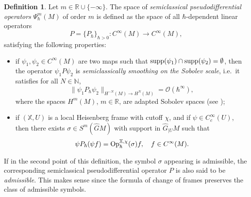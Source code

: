 \documentclass[12pt,a4paper]{amsart}
\theoremstyle{plain}
\theoremstyle{definition}
\newtheorem{definition}[theorem]{Definition}
\theoremstyle{remark}
\numberwithin{equation}{section}
\theoremstyle{definition}
\def\R{{\mathbb R}}%
\def\N{{\mathbb N}}%
\def \Op{{\rm Op}}
\def \supp {{\rm supp}}
\def \bX{\mathbb{X}}
\def \Ghat{\widehat{G}}
\numberwithin{equation}{section}
\begin{document}
\begin{definition}
    \label{def:pseudodiffM}
    Let $m\in\R\cup\{-\infty\}$. The space of \emph{semiclassical pseudodifferential operators} $\Psi_{\hbar}^m(M)$ of order $m$ is defined as the space of all $\hbar$-dependent linear operators 
    \begin{equation*}
        P = \{P_\hbar\}_{\hbar>0}: C^\infty(M)\rightarrow C^\infty(M),
    \end{equation*}
    satisfying the following properties:
    \begin{itemize}
        \item[(i)] if $\psi_1,\psi_2\in C^\infty(M)$ are two maps such that $\supp(\psi_1)\cap\supp(\psi_2) = \emptyset$, then the operator $\psi_1 P \psi_2$ is \emph{semiclassically smoothing on the Sobolev scale}, i.e.~it satisfies for all $N\in \N$,
        \begin{equation*}
            \|\psi_1 P_\hbar \psi_2 \|_{H^{-N}(M)\rightarrow H^{N}(M)} = \mathscr{O}(\hbar^\infty),
        \end{equation*}
        where the spaces $H^m(M)$, $m\in \R$, are adapted Sobolev spaces (see \cite[Section 9.5]{FFF24});
        \item[(ii)] if $(\bX,U)$ is a local Heisenberg frame with cutoff $\chi$, and if $\psi\in C_{c}^\infty(U)$, then there exists $\sigma \in S^m(\Ghat M)$ with support in $\Ghat_{|U}M$ such that 
        \begin{equation*}
            \psi P_\hbar(\psi f) = \Op_{\hbar}^{\bX,\chi}(\sigma)f,\quad f\in C^\infty(M).
        \end{equation*}
    \end{itemize}
\end{definition}

If in the second point of this definition, the symbol $\sigma$ appearing is admissible, the corresponding semiclassical pseudodifferential operator $P$ is also said to be \emph{admissible}. This makes sense since the formula of change of frames preserves the class of admissible symbols.

\vspace{0.25cm}
\end{document}
